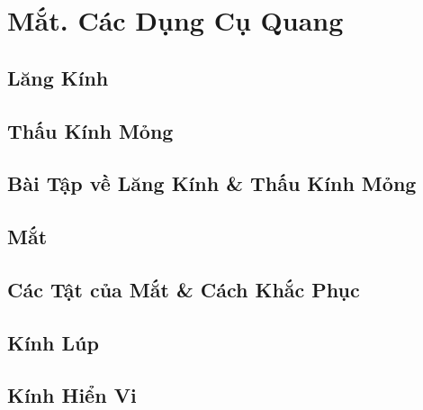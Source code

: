 \documentclass[oneside]{book}
\numberwithin{equation}{section}
\begin{document}
\chapter{Mắt. Các Dụng Cụ Quang}

\section{Lăng Kính}


\section{Thấu Kính Mỏng}


\section{Bài Tập về Lăng Kính \& Thấu Kính Mỏng}


\section{Mắt}


\section{Các Tật của Mắt \& Cách Khắc Phục}


\section{Kính Lúp}


\section{Kính Hiển Vi}

\end{document}
